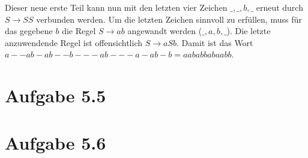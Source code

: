 \documentclass{article}
\begin{document}
Dieser neue erste Teil kann nun mit den letzten vier Zeichen $\_,\_,b,\_$ erneut durch $S \rightarrow SS$ verbunden werden. Um die letzten Zeichen sinnvoll zu erfüllen, muss für das gegebene $b$ die Regel $S \rightarrow ab$ angewandt werden ($\_,a,b,\_$). Die letzte anzuwendende Regel ist offensichtlich $S \rightarrow aSb$. Damit ist das Wort \linebreak $a--ab-ab--b---ab---a-ab-b = aababbabaabb$.


\section*{Aufgabe 5.5}



\section*{Aufgabe 5.6}
\end{document}
